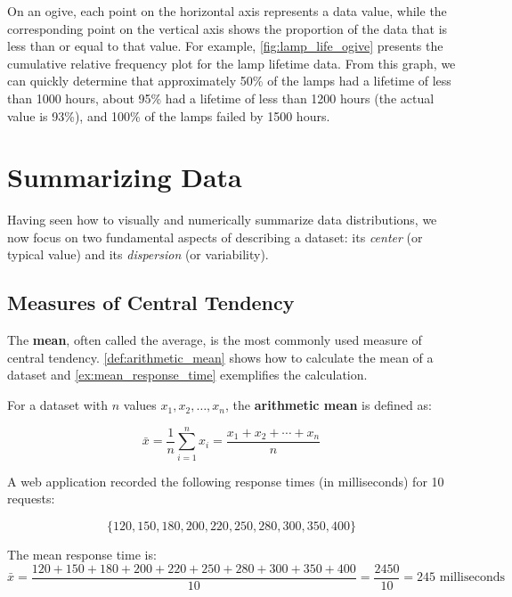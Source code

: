 On an ogive, each point on the horizontal axis represents a data value, while the corresponding point on the vertical axis shows the proportion of the data that is less than or equal to that value. For example, \autoref{fig:lamp_life_ogive} presents the cumulative relative frequency plot for the lamp lifetime data. From this graph, we can quickly determine that approximately 50\% of the lamps had a lifetime of less than 1000 hours, about 95\% had a lifetime of less than 1200 hours (the actual value is 93\%), and 100\% of the lamps failed by 1500 hours.

\section{Summarizing Data}
Having seen how to visually and numerically summarize data distributions, we now focus on two fundamental aspects of describing a dataset: its \emph{center} (or typical value) and its \emph{dispersion} (or variability).

\subsection*{Measures of Central Tendency}
The \textbf{mean}, often called the average, is the most commonly used measure of central tendency. \autoref{def:arithmetic_mean} shows how to calculate the mean of a dataset and \autoref{ex:mean_response_time} exemplifies the calculation.

\begin{definition} \label{def:arithmetic_mean}

For a dataset with $n$ values $x_1, x_2, \ldots, x_n$, the \textbf{arithmetic mean} is defined as:

$$
\bar{x} = \frac{1}{n}\sum_{i=1}^{n} x_i = \frac{x_1 + x_2 + \cdots + x_n}{n}
$$

\end{definition}


\begin{example} \label{ex:mean_response_time}\par

A web application recorded the following response times (in milliseconds) for 10 requests:

\[
\{120, 150, 180, 200, 220, 250, 280, 300, 350, 400\}
\]

The mean response time is:
\[
\bar{x} = \frac{120 + 150 + 180 + 200 + 220 + 250 + 280 + 300 + 350 + 400}{10} = \frac{2450}{10} = 245 \text{ milliseconds}
\]
\end{example}

